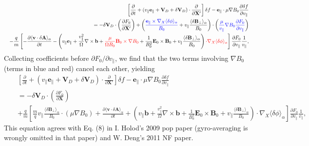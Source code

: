 \documentclass{llncs}
\newcommand{\tmcolor}[2]{{\color{#1}{#2}}}
\begin{document}
\begin{eqnarray}
  &  & \left[ \frac{\partial}{\partial t} + (v_{\parallel}
  \mathbf{e}_{\parallel} +\mathbf{V}_D + \delta \mathbf{V}_D) \cdot
  \frac{\partial}{\partial \mathbf{X}'} \right] \delta f
  -\mathbf{e}_{\parallel} \cdot \mu \nabla B_0 \frac{\partial \delta
  f}{\partial v_{\parallel}} \nonumber\\
  &  & = - \delta \mathbf{V}_D \cdot \left( \frac{\partial F_0}{\partial
  \mathbf{X}'} \right) + \left( \tmcolor{blue}{\frac{\mathbf{e}_{\parallel}
  \times \nabla_X \langle \delta \phi \rangle_{\alpha}}{B_0}} + v_{\parallel}
  \frac{\langle \delta \mathbf{B}_{\perp} \rangle_{\alpha}}{B_0} \right) \cdot
  \left( \tmcolor{blue}{\frac{\mu}{v_{\parallel}} \nabla B_0 \frac{\partial
  F_0}{\partial v_{\parallel}}} \right) \nonumber\\
  &  & - \frac{q}{m} \left[ - \frac{\partial \langle \mathbf{v} \cdot \delta
  \mathbf{A} \rangle_{\alpha}}{\partial t} - \left( v_{\parallel}
  \mathbf{e}_{\parallel} + \frac{v_{\parallel}^2}{\Omega} \nabla \times
  \mathbf{b}+ \tmcolor{red}{\frac{\mu}{\Omega B_0} \mathbf{B}_0 \times \nabla
  B_0} + \frac{1}{B_0^2} \mathbf{E}_0 \times \mathbf{B}_0 + v_{\parallel}
  \frac{\langle \delta \mathbf{B}_{\perp} \rangle_{\alpha}}{B_0} \right)
  \tmcolor{red}{\cdot \nabla_X \langle \delta \phi \rangle_{\alpha}} \right]
  \frac{\partial F_0}{\partial v_{\parallel}}  \frac{1}{v_{\parallel}}, 
\end{eqnarray}
Collecting coefficients before $\partial F_0 / \partial v_{\parallel}$, we
find that the two terms involving $\nabla B_0$ (terms in blue and red) cancel
each other, yielding
\begin{eqnarray}
  &  & \left[ \frac{\partial}{\partial t} + (v_{\parallel}
  \mathbf{e}_{\parallel} +\mathbf{V}_D + \delta \mathbf{V}_D) \cdot
  \frac{\partial}{\partial \mathbf{X}'} \right] \delta f
  -\mathbf{e}_{\parallel} \cdot \mu \nabla B_0 \frac{\partial \delta
  f}{\partial v_{\parallel}} \nonumber\\
  &  & = - \delta \mathbf{V}_D \cdot \left( \frac{\partial F_0}{\partial
  \mathbf{X}} \right) \nonumber\\
  &  & + \frac{q}{m} \left[ \frac{m}{q} v_{\parallel} \frac{\langle \delta
  \mathbf{B}_{\perp} \rangle_{\alpha}}{B_0} \cdot (\mu \nabla B_0) +
  \frac{\partial \langle \mathbf{v} \cdot \delta \mathbf{A}
  \rangle_{\alpha}}{\partial t} + \left( v_{\parallel} \mathbf{b}+
  \frac{v_{\parallel}^2}{\Omega} \nabla \times \mathbf{b}+ \frac{1}{B_0^2}
  \mathbf{E}_0 \times \mathbf{B}_0 + v_{\parallel} \frac{\langle \delta
  \mathbf{B}_{\perp} \rangle_{\alpha}}{B_0} \right) \cdot \nabla_X \langle
  \delta \phi \rangle_{\alpha} \right] \frac{\partial F_0}{\partial
  v_{\parallel}}  \frac{1}{v_{\parallel}},  \label{18-9-18-e1}
\end{eqnarray}
This equation agrees with Eq. (8) in I. Holod's 2009 pop paper (gyro-averaging
is wrongly omitted in that paper) and W. Deng's 2011 NF paper.
\end{document}
